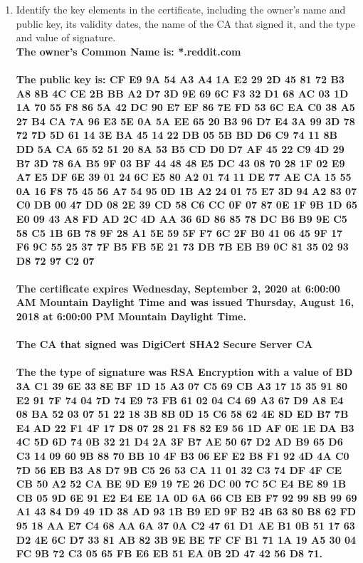 \documentclass[12pt]{article}
\begin{document}
\begin{enumerate}
  \begin{enumerate}
    \item Identify the key elements in the certificate, including the owner's name and public key, its validity dates, the name of the CA that signed it, and the type and value of signature. \\

    \textbf{The owner's Common Name is: *.reddit.com} \\ \\
    \textbf{The public key is: CF E9 9A 54 A3 A4 1A E2 29 2D 45 81 72 B3 A8 8B 4C CE 2B BB A2 D7 3D 9E 69 6C F3 32 D1 68 AC 03 1D 1A 70 55 F8 86 5A 42 DC 90 E7 EF 86 7E FD 53 6C EA C0 38 A5 27 B4 CA 7A 96 E3 5E 0A 5A EE 65 20 B3 96 D7 E4 3A 99 3D 78 72 7D 5D 61 14 3E BA 45 14 22 DB 05 5B BD D6 C9 74 11 8B DD 5A CA 65 52 51 20 8A 53 B5 CD D0 D7 AF 45 22 C9 4D 29 B7 3D 78 6A B5 9F 03 BF 44 48 48 E5 DC 43 08 70 28 1F 02 E9 A7 E5 DF 6E 39 01 24 6C E5 80 A2 01 74 11 DE 77 AE CA 15 55 0A 16 F8 75 45 56 A7 54 95 0D 1B A2 24 01 75 E7 3D 94 A2 83 07 C0 DB 00 47 DD 08 2E 39 CD 58 C6 CC 0F 07 87 0E 1F 9B 1D 65 E0 09 43 A8 FD AD 2C 4D AA 36 6D 86 85 78 DC B6 B9 9E C5 58 C5 1B 6B 78 9F 28 A1 5E 59 5F F7 6C 2F B0 41 06 45 9F 17 F6 9C 55 25 37 7F B5 FB 5E 21 73 DB 7B EB B9 0C 81 35 02 93 D8 72 97 C2 07} \\ \\
    \textbf{The certificate expires Wednesday, September 2, 2020 at 6:00:00 AM Mountain Daylight Time and was issued Thursday, August 16, 2018 at 6:00:00 PM Mountain Daylight Time.} \\ \\
    \textbf{The CA that signed was DigiCert SHA2 Secure Server CA} \\ \\
    \textbf{The the type of signature was RSA Encryption with a value of BD 3A C1 39 6E 33 8E BF 1D 15 A3 07 C5 69 CB A3 17 15 35 91 80 E2 91 7F 74 04 7D 74 E9 73 FB 61 02 04 C4 69 A3 67 D9 A8 E4 08 BA 52 03 07 51 22 18 3B 8B 0D 15 C6 58 62 4E 8D ED B7 7B E4 AD 22 F1 4F 17 D8 07 28 21 F8 82 E9 56 1D AF 0E 1E DA B3 4C 5D 6D 74 0B 32 21 D4 2A 3F B7 AE 50 67 D2 AD B9 65 D6 C3 14 09 60 9B 88 70 BB 10 4F B3 06 EF E2 B8 F1 92 4D 4A C0 7D 56 EB B3 A8 D7 9B C5 26 53 CA 11 01 32 C3 74 DF 4F CE CB 50 A2 52 CA BE 9D E9 19 7E 26 DC 00 7C 5C E4 BE 89 1B CB 05 9D 6E 91 E2 E4 EE 1A 0D 6A 66 CB EB F7 92 99 8B 99 69 A1 43 84 D9 49 1D 38 AD 93 1B B9 ED 9F B2 4B 63 80 B8 62 FD 95 18 AA E7 C4 68 AA 6A 37 0A C2 47 61 D1 AE B1 0B 51 17 63 D2 4E 6C D7 33 81 AB 82 3B 9E BE 7F CF B1 71 1A 19 A5 30 04 FC 9B 72 C3 05 65 FB E6 EB 51 EA 0B 2D 47 42 56 D8 71.} \\



\end{enumerate}
\end{enumerate}
\end{document}
